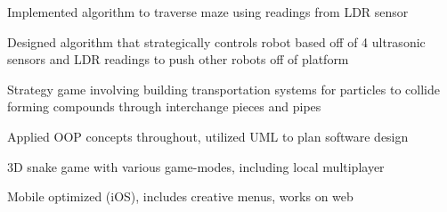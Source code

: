 \documentclass[]{deedy-resume-openfont}
\begin{document}
\begin{minipage}[t]{0.66\textwidth}
\begin{tightemize}
\item Implemented algorithm to traverse maze using readings from LDR sensor \\
\item Designed algorithm that strategically controls robot based off of 4 ultrasonic sensors and LDR readings to push other robots off of platform\\
\end{tightemize}
\sectionsep

\begin{tightemize}
\item Strategy game involving building transportation systems for particles to collide forming compounds through interchange pieces and pipes\\
\item Applied OOP concepts throughout, utilized UML to plan software design \\
\end{tightemize}
\sectionsep


\begin{tightemize}
\item 3D snake game with various game-modes, including local multiplayer\\
\item Mobile optimized (iOS), includes creative menus, works on web\\
\end{tightemize}
\sectionsep


\end{minipage}
\end{document}
